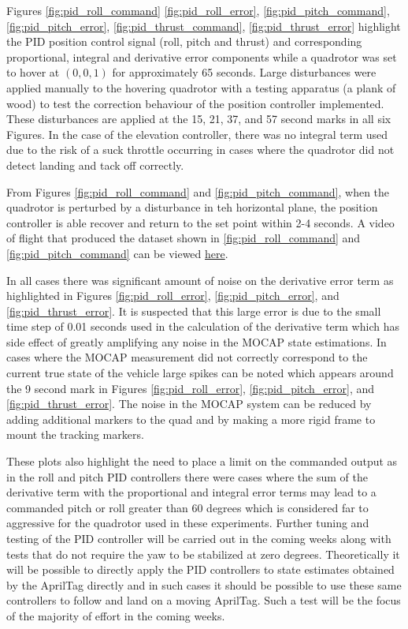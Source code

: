 \documentclass[11pt, twocolumn]{article}
\begin{document}
Figures \ref{fig:pid_roll_command} \ref{fig:pid_roll_error},	\ref{fig:pid_pitch_command}, \ref{fig:pid_pitch_error}, \ref{fig:pid_thrust_command}, \ref{fig:pid_thrust_error} highlight the PID position control signal (roll, pitch and thrust) and corresponding proportional, integral and derivative error components while a quadrotor was set to hover at $(0, 0, 1)$ for approximately 65 seconds. Large disturbances were applied manually to the hovering quadrotor with a testing apparatus (a plank of wood) to test the correction behaviour of the position controller implemented. These disturbances are applied at the 15, 21, 37, and 57 second marks in all six Figures. In the case of the elevation controller, there was no integral term used due to the risk of a suck throttle occurring in cases where the quadrotor did not detect landing and tack off correctly.

From Figures \ref{fig:pid_roll_command} and \ref{fig:pid_pitch_command}, when the quadrotor is perturbed by a disturbance in teh horizontal plane, the position controller is able recover and return to the set point within 2-4 seconds. A video of flight that produced the dataset shown in \ref{fig:pid_roll_command} and \ref{fig:pid_pitch_command} can be viewed \href{https://www.youtube.com/watch?v=v1QDdZ0LdMc&index=17&list=PLk5z6lLnKFd6BD9EXWa09hqf6SNQhn59R}{here}.

In all cases there was significant amount of noise on the derivative error term as highlighted in Figures \ref{fig:pid_roll_error}, \ref{fig:pid_pitch_error}, and \ref{fig:pid_thrust_error}. It is suspected that this large error is due to the small time step of 0.01 seconds used in the calculation of the derivative term which has side effect of greatly amplifying any noise in the MOCAP state estimations. In cases where the MOCAP measurement did not correctly correspond to the current true state of the vehicle large spikes can be noted which appears around the 9 second mark in Figures \ref{fig:pid_roll_error}, \ref{fig:pid_pitch_error}, and \ref{fig:pid_thrust_error}. The noise in the MOCAP system can be reduced by adding additional markers to the quad and by making a more rigid frame to mount the tracking markers. 

These plots also highlight the need to place a limit on the commanded output as in the roll and pitch PID controllers there were cases where the sum of the derivative term with the proportional and integral error terms may lead to a commanded pitch or roll greater than 60 degrees which is considered far to aggressive for the quadrotor used in these experiments. Further tuning and testing of the PID controller will be carried out in the coming weeks along with tests that do not require the yaw to be stabilized at zero degrees. Theoretically it will be possible to directly apply the PID controllers to state estimates obtained by the AprilTag directly and in such cases it should be possible to use these same controllers to follow and land on a moving AprilTag. Such a test will be the focus of the majority of effort in the coming weeks. 
\end{document}
